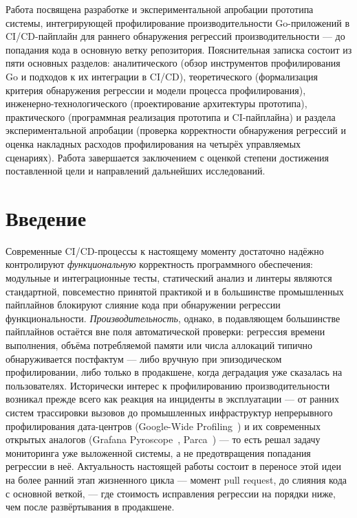 \documentclass[12pt,a4paper]{article}
\newcommand{\newrazdel}{\clearpage}
\numberwithin{equation}{section}
\begin{document}
Работа посвящена разработке и экспериментальной апробации прототипа
системы, интегрирующей профилирование производительности Go-приложений в
CI/CD-пайплайн для раннего обнаружения регрессий производительности —
до попадания кода в основную ветку репозитория. Пояснительная записка
состоит из пяти основных разделов: аналитического (обзор инструментов
профилирования Go и подходов к их интеграции в CI/CD), теоретического
(формализация критерия обнаружения регрессии и модели процесса
профилирования), инженерно-технологического (проектирование архитектуры
прототипа), практического (программная реализация прототипа и CI-пайплайна)
и раздела экспериментальной апробации (проверка корректности обнаружения
регрессий и оценка накладных расходов профилирования на четырёх
управляемых сценариях). Работа завершается заключением с оценкой степени
достижения поставленной цели и направлений дальнейших исследований.

\newrazdel
\tableofcontents
\thispagestyle{plain}

\newrazdel
\section*{Введение}

Современные CI/CD-процессы к настоящему моменту достаточно надёжно
контролируют \emph{функциональную} корректность программного обеспечения:
модульные и интеграционные тесты, статический анализ и линтеры являются
стандартной, повсеместно принятой практикой и в большинстве промышленных
пайплайнов блокируют слияние кода при обнаружении регрессии
функциональности. \emph{Производительность}, однако, в подавляющем
большинстве пайплайнов остаётся вне поля автоматической проверки:
регрессия времени выполнения, объёма потребляемой памяти или числа
аллокаций типично обнаруживается постфактум — либо вручную при
эпизодическом профилировании, либо только в продакшене, когда деградация
уже сказалась на пользователях. Исторически интерес к профилированию
производительности возникал прежде всего как реакция на инциденты в
эксплуатации — от ранних систем трассировки вызовов до промышленных
инфраструктур непрерывного профилирования дата-центров (Google-Wide
Profiling~\cite{ren2010}) и их современных открытых аналогов (Grafana
Pyroscope~\cite{pyroscope-doc}, Parca~\cite{parca-doc}) — то есть решал
задачу мониторинга уже выложенной системы, а не предотвращения попадания
регрессии в неё. Актуальность настоящей работы состоит в переносе этой
идеи на более ранний этап жизненного цикла — момент pull request, до
слияния кода с основной веткой, — где стоимость исправления регрессии на
порядки ниже, чем после развёртывания в продакшене.
\end{document}
